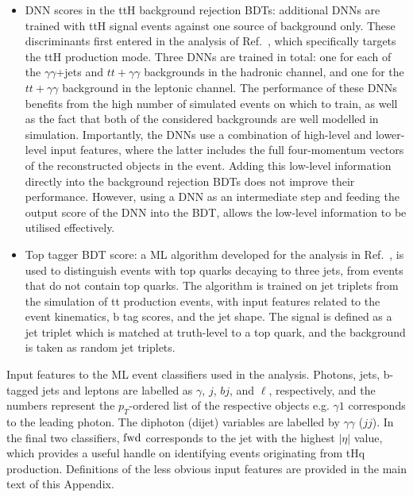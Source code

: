 \begin{itemize}
    \item DNN scores in the ttH background rejection BDTs: additional DNNs are trained with ttH signal events against one source of background only. These discriminants first entered in the \Hgg analysis of Ref.~\cite{Sirunyan:2020sum}, which specifically targets the ttH production mode. Three DNNs are trained in total: one for each of the $\gamma\gamma$+jets and $tt+\gamma\gamma$ backgrounds in the hadronic channel, and one for the $tt+\gamma\gamma$ background in the leptonic channel. The performance of these DNNs benefits from the high number of simulated events on which to train, as well as the fact that both of the considered backgrounds are well modelled in simulation. Importantly, the DNNs use a combination of high-level and lower-level input features, where the latter includes the full four-momentum vectors of the reconstructed objects in the event. Adding this low-level information directly into the background rejection BDTs does not improve their performance. However, using a DNN as an intermediate step and feeding the output score of the DNN into the BDT, allows the low-level information to be utilised effectively.
    \item Top tagger BDT score: a ML algorithm developed for the analysis in Ref.~\cite{Sirunyan:2017wif}, is used to distinguish events with top quarks decaying to three jets, from events that do not contain top quarks. The algorithm is trained on jet triplets from the simulation of tt production events, with input features related to the event kinematics, b tag scores, and the jet shape. The signal is defined as a jet triplet which is matched at truth-level to a top quark, and the background is taken as random jet triplets.
\end{itemize}

\begin{table}[htb]
    \caption[Input features to the \Hgg event classifiers]{Input features to the ML event classifiers used in the \Hgg analysis. Photons, jets, b-tagged jets and leptons are labelled as $\gamma$, $j$, $bj$, and $\ell$, respectively,  and the numbers represent the $p_T$-ordered list of the respective objects e.g. $\gamma 1$ corresponds to the leading photon. The diphoton (dijet) variables are labelled by $\gamma\gamma$ ($jj$). In the final two classifiers, $\rm{fwd}$ corresponds to the jet with the highest $|\eta|$ value, which provides a useful handle on identifying events originating from tHq production. Definitions of the less obvious input features are provided in the main text of this Appendix.}
    \label{tab:categorisation_input_features}
    \centering
    \scriptsize
    \renewcommand{\arraystretch}{3}
    \setlength{\tabcolsep}{6pt}
    
\end{table}

